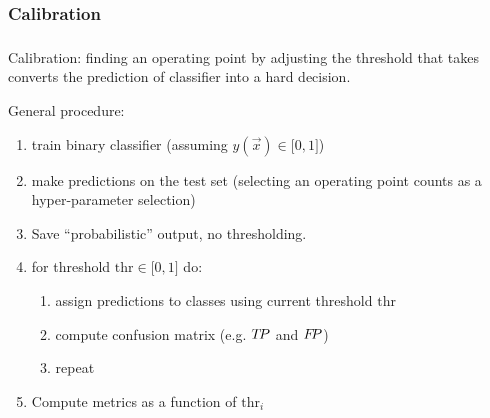 \subsubsection{Calibration}

\begin{frame}\frametitle{\subsubsecname}

Calibration: finding an operating point by adjusting the threshold that takes converts the prediction of classifier into a hard decision.

General procedure:
\begin{enumerate}
\item train binary classifier (assuming $y(\vec x) \in \lbrack0,1\rbrack$)
\item make predictions on the test set (selecting an operating point counts as a hyper-parameter selection)
\item Save ``probabilistic'' output, no thresholding.
\item for threshold $\mathrm{thr} \in \lbrack0,1\rbrack$ do:
\begin{enumerate}
	\item assign predictions to classes using current threshold $\mathrm{thr}$
	\item compute confusion matrix (e.g. $T\kern-.4exP$ and $F\kern-.5exP$)
	\item[]repeat
\end{enumerate}
\item Compute metrics as a function of $\mathrm{thr}_i$
\end{enumerate}



\end{frame}

